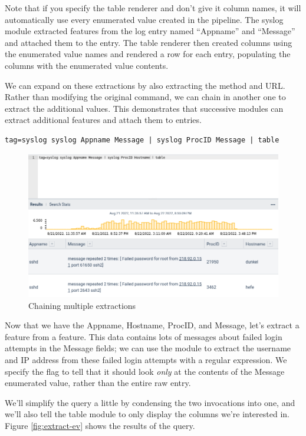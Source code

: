 Note that if you specify the table renderer and don't give it column
names, it will automatically use every enumerated value created in the
pipeline. The syslog module extracted features from the log
entry named ``Appname'' and ``Message'' and attached them to the entry. The
table renderer then created columns using the enumerated value names
and rendered a row for each entry, populating the columns with the
enumerated value contents.

We can expand on these extractions by also extracting the method and
URL. Rather than modifying the original  command, we can
chain in another one to extract the additional values. This demonstrates that successive modules can
extract additional features and attach them to entries.

\begin{Verbatim}[breaklines=true]
tag=syslog syslog Appname Message | syslog ProcID Message | table
\end{Verbatim}

\begin{figure}
	\includegraphics[width=0.8\linewidth]{images/extract-chaining.png}
	\caption{Chaining multiple extractions}
	\label{fig:extract-chaining}
\end{figure}

Now that we have the Appname, Hostname, ProcID, and Message, let's extract a
feature from a feature. This data contains lots of messages about failed login attempts in the Message fields; we can use the  module to extract the username and IP address from these failed login attempts with a regular expression. We specify the  flag to tell  that it should look \emph{only} at the contents of the Message enumerated value, rather than the entire raw entry.

We'll simplify the query a little by condensing the two  invocations into one, and we'll also tell the table module to only display the columns we're interested in. Figure \ref{fig:extract-ev} shows
the results of the query.

